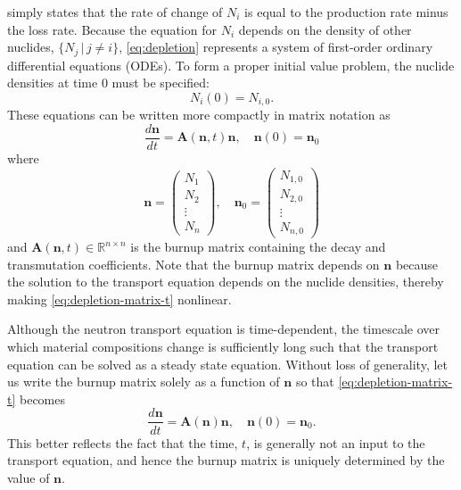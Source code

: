 \documentclass[3p,authoryear]{elsarticle}
\newcommand{\vect}[1]{\mathbf{#1}} %
\begin{document}
 simply states that the rate of change of $N_i$ is equal to
the production rate minus the loss rate. Because the equation for $N_i$ depends
on the density of other nuclides, $\{N_j \,|\, j \ne i\}$, \cref{eq:depletion}
represents a system of first-order ordinary differential equations (ODEs). To
form a proper initial value problem, the nuclide densities at time 0 must be
specified:
\begin{equation}
    N_i(0) = N_{i,0}.
\end{equation}
These equations can be written more compactly in matrix notation as
\begin{equation}
  \label{eq:depletion-matrix-t}
  \frac{d\vect{n}}{dt} = \vect{A}(\vect{n},t)\vect{n}, \quad \vect{n}(0) =
  \vect{n}_0
\end{equation}
where
\begin{equation}
  \vect{n} = \begin{pmatrix} N_1 \\ N_2 \\ \vdots \\ N_n \end{pmatrix}, \quad
  \vect{n}_0 = \begin{pmatrix} N_{1,0} \\ N_{2,0} \\ \vdots \\ N_{n,0} \end{pmatrix}
\end{equation}
and $\vect{A}(\vect{n},t) \in \mathbb{R}^{n\times n}$ is the burnup matrix
containing the decay and transmutation coefficients. Note that the burnup matrix
depends on $\vect{n}$ because the solution to the transport equation depends
on the nuclide densities, thereby making \cref{eq:depletion-matrix-t} nonlinear.

Although the neutron transport equation is time-dependent, the timescale over
which material compositions change is sufficiently long such that the transport
equation can be solved as a steady state equation. Without loss of generality,
let us write the burnup matrix solely as a function of $\vect{n}$ so that
\cref{eq:depletion-matrix-t} becomes
\begin{equation}
  \label{eq:depletion-matrix}
  \frac{d\vect{n}}{dt} = \vect{A}(\vect{n})\vect{n}, \quad \vect{n}(0) =
  \vect{n}_0.
\end{equation}
This better reflects the fact that the time, $t$, is generally not an input to
the transport equation, and hence the burnup matrix is uniquely determined by
the value of $\vect{n}$.
\end{document}
